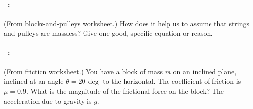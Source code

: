 \documentclass[12pt]{article}
\begin{document}
\vfill

\paragraph{\problemname~\theproblem:}%
(From blocks-and-pulleys worksheet.) How does it help us to assume
that strings and pulleys are massless? Give one good, specific
equation or reason.

\vfill

\paragraph{\problemname~\theproblem:}%
(From friction worksheet.) You have a block of mass $m$ on an inclined
plane, inclined at an angle $\theta=20\,\deg$ to the horizontal. The
coefficient of friction is $\mu=0.9$. What is the magnitude of the
frictional force on the block? The acceleration due to gravity is $g$.

\vfill
~
\end{document}
